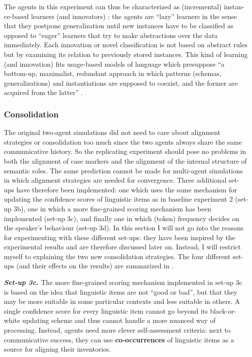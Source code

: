 The agents in this experiment can thus be characterized as (incremental) instan-ce-based learners (and innovators) \citep[Chapter 8]{mitchell97machine}: the agents are ``lazy'' learners in the sense that they postpone generalization until new instances have to be classified as opposed to ``eager'' learners that try to make abstractions over the data immediately. Each innovation or novel classification is not based on abstract rules but by examining its relation to previously stored instances.  This kind of learning (and innovation) fits usage-based models of language which presuppose  ``a bottom-up, maximalist, redundant approach in which patterns (schemas, generalizations) and instantiations are supposed to coexist, and the former are acquired from the latter'' \citep[20]{daelemans05memory}.


\subsubsection{Consolidation}
 The original two-agent simulations did not need to care about alignment strategies or consolidation too much since the two agents always share the same communicative history. So the replicating experiment should pose no problems in both the alignment of case markers and the alignment of the internal structure of semantic roles. The same prediction cannot be made for multi-agent simulations in which alignment strategies are needed for convergence. Three additional set-ups have therefore been implemented: one which uses the same mechanism for updating the confidence scores of linguistic items as in baseline experiment 2 (set-up 3b), one in which a more fine-grained scoring mechanism has been implemented (set-up 3c), and finally one in which (token) frequency decides on the speaker's behaviour (set-up 3d). In this section I will not go into the reasons for experimenting with these different set-ups: they have been inspired by the experimental results and are therefore discussed later on. Instead, I will restrict myself to explaining the two new consolidation strategies. The four different set-ups (and their effects on the results) are summarized in .


{\bfseries {\em Set-up 3c. }}The more fine-grained scoring mechanism implemented in set-up 3c is based on the idea that linguistic items are not ``good or bad'', but that they may be more suitable in some particular contexts and less suitable in others. A single confidence score for every linguistic item cannot go beyond its black-or-white updating scheme and thus cannot handle a more nuanced way of processing. Instead, agents need more clever self-assessment criteria: next to communicative success, they can use {\bfseries co-occurrences} of linguistic items as a source for aligning their inventories. 

